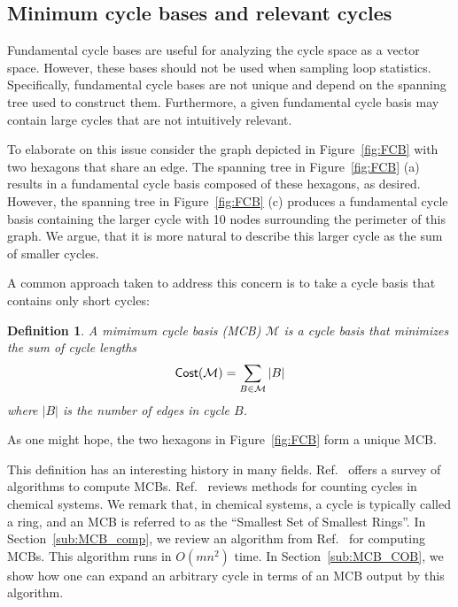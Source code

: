 \documentclass[fleqn,11pt]{article}
\newtheorem{definition}{Definition}
\newcommand\calM{\mathcal{M}}
\begin{document}
\subsection{Minimum cycle bases and relevant cycles}

\label{sub:MCB+Vis_Fam}
Fundamental cycle bases are useful for analyzing the cycle space as a vector space. However, these bases should not be used when sampling loop statistics. Specifically, fundamental cycle bases are not unique and depend on the spanning tree used to construct them. Furthermore, a given fundamental cycle basis may contain large cycles that are not intuitively relevant.

To elaborate on this issue consider the graph depicted in Figure~\ref{fig:FCB} with two hexagons that share an edge. The spanning tree in Figure~\ref{fig:FCB} (a) results in a fundamental cycle basis composed of these hexagons, as desired. However, the spanning tree in Figure~\ref{fig:FCB} (c) produces a fundamental cycle basis containing the larger cycle with 10 nodes surrounding the perimeter of this graph. We argue, that it is more natural to describe this larger cycle as the sum of smaller cycles.

A common approach taken to address this concern is to take a cycle basis that contains only short cycles:
\begin{definition}
	A \emph{mimimum cycle basis (MCB)} $\calM$ is a cycle basis that minimizes the sum of cycle lengths
	\begin{equation*}
		{\sf Cost}(\calM) = \sum_{B\in\calM} |B|
	\end{equation*}
	where $|B|$ is the number of edges in cycle $B$.
\end{definition}
\noindent As one might hope, the two hexagons in Figure~\ref{fig:FCB} form a unique MCB.

This definition has an interesting history in many fields. Ref.~\cite{kavithaCycle2009} offers a survey of algorithms to compute MCBs. 
Ref.~\cite{bergerCounterexamples2004} reviews methods for counting cycles in chemical systems. 
We remark that, in chemical systems, a cycle is typically called a ring, and an MCB is referred to as the ``Smallest Set of Smallest Rings''. In Section~\ref{sub:MCB_comp}, we review an algorithm from Ref.~\cite{kavithaFaster2004} for computing MCBs. This algorithm runs in $O(mn^2)$ time. In Section~\ref{sub:MCB_COB}, we show how one can expand an arbitrary cycle in terms of an MCB output by this algorithm. 
\end{document}
